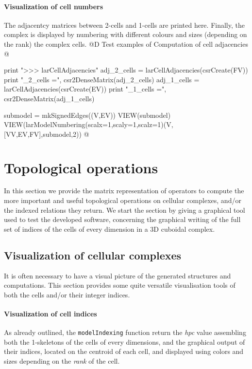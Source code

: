 \documentclass[11pt,oneside]{article}	%
\begin{document}
\paragraph{Visualization of cell numbers}
The adjacentcy matrices between 2-cells and 1-cells are printed here. Finally, the complex is displayed by numbering with different colours and sizes (depending on the rank) the complex cells.
@D Test examples of Computation of cell adjacencies
@{
print "\n>>> larCellAdjacencies"
adj_2_cells = larCellAdjacencies(csrCreate(FV))
print "\nadj_2_cells =\n", csr2DenseMatrix(adj_2_cells)
adj_1_cells = larCellAdjacencies(csrCreate(EV))
print "\nadj_1_cells =\n", csr2DenseMatrix(adj_1_cells)

submodel = mkSignedEdges((V,EV))
VIEW(submodel)
VIEW(larModelNumbering(scalx=1,scaly=1,scalz=1)(V,[VV,EV,FV],submodel,2))
@}


\section{Topological operations}

In this section we provide the matrix representation of operators to compute the more important and useful topological operations on cellular complexes, and/or the indexed relations they return. We start the section by giving a graphical tool used to test the developed software, concerning the graphical writing of the full set of indices of the cells of every dimension in a 3D cuboidal complex.  

\subsection{Visualization of cellular complexes}

It is often necessary to have a visual picture of the generated structures and computations.
This section provides some quite versatile visualisation tools of both the cells and/or their integer indices.

\paragraph{Visualization of cell indices}
As already outlined, the \texttt{modelIndexing} function return the \emph{hpc} value assembling both the 1-skeletons of the cells of every dimensions, and the graphical output of their indices, located on the centroid of each cell, and displayed using colors and sizes depending on the \emph{rank} of the cell.
\end{document}

